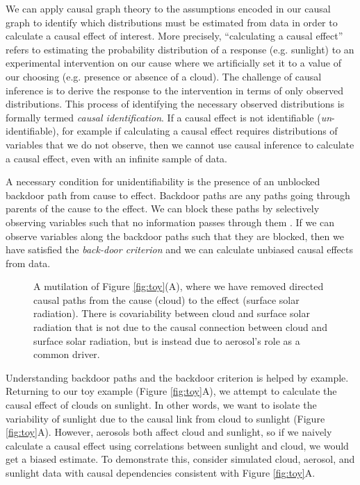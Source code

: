 \documentclass[12pt]{article}
\begin{document}
We can apply causal graph theory
\citep[e.g.,][]{pearl1995causal,shpitser2006} to the assumptions
encoded in our causal graph to identify which distributions must be
estimated from data in order to calculate a causal effect of
interest. More precisely, ``calculating a causal effect'' refers to
estimating the probability distribution of a response (e.g. sunlight)
to an experimental intervention on our cause where we artificially set
it to a value of our choosing (e.g. presence or absence of a
cloud). The challenge of causal inference is to derive the response to
the intervention in terms of only observed distributions. This process
of identifying the necessary observed distributions is formally termed
\emph{causal identification}. If a causal effect is not identifiable
(\emph{un}-identifiable), for example if calculating a causal effect
requires distributions of variables that we do not observe, then we
cannot use causal inference to calculate a causal effect, even with an
infinite sample of data.


A necessary condition for unidentifiability is the presence of an
unblocked backdoor path from cause to effect. Backdoor paths are any
paths going through parents of the cause to the effect. We can block
these paths by selectively observing variables such that no
information passes through them \citep{geiger-d-sep}. If we can
observe variables along the backdoor paths such that they are blocked,
then we have satisfied the \emph{back-door criterion}
\citep{pearl2009} and we can calculate unbiased causal effects from
data.

\begin{figure}
  
  \caption{A mutilation of Figure \ref{fig:toy}(A), where we have
    removed directed causal paths from the cause (cloud) to the effect
    (surface solar radiation). There is covariability between cloud
    and surface solar radiation that is not due to the causal
    connection between cloud and surface solar radiation, but is
    instead due to aerosol's role as a common driver.}
  \label{fig:mutilated-toy}
\end{figure}

Understanding backdoor paths and the backdoor criterion is helped by
example. Returning to our toy example (Figure \ref{fig:toy}A), we
attempt to calculate the causal effect of clouds on sunlight. In other
words, we want to isolate the variability of sunlight due to the
causal link from cloud to sunlight (Figure \ref{fig:toy}A). However,
aerosols both affect cloud and sunlight, so if we naively calculate a
causal effect using correlations between sunlight and cloud, we would
get a biased estimate. To demonstrate this, consider simulated cloud,
aerosol, and sunlight data with causal dependencies consistent with
Figure \ref{fig:toy}A.
\end{document}
